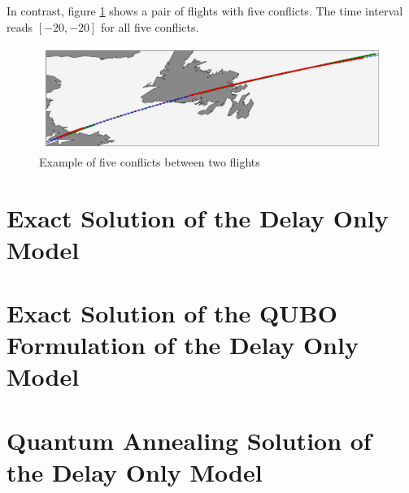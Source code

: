 \documentclass{article}
\begin{document}
In contrast, figure \ref{fig:pre_flight_pair_with_five_conflicts} shows a pair of flights with five conflicts.
The time interval reads $[-20, -20]$ for all five conflicts.
\begin{figure}[htpb]
    \centering
    \includegraphics[width=1.0\linewidth]{pics/pre_flight_pair_with_five_conflicts.pdf}
    \caption{Example of five conflicts between two flights}
    \label{fig:pre_flight_pair_with_five_conflicts}
\end{figure}


\section{Exact Solution of the Delay Only Model}
\section{Exact Solution of the QUBO Formulation of the Delay Only Model}
\section{Quantum Annealing Solution of the Delay Only Model}
\end{document}
